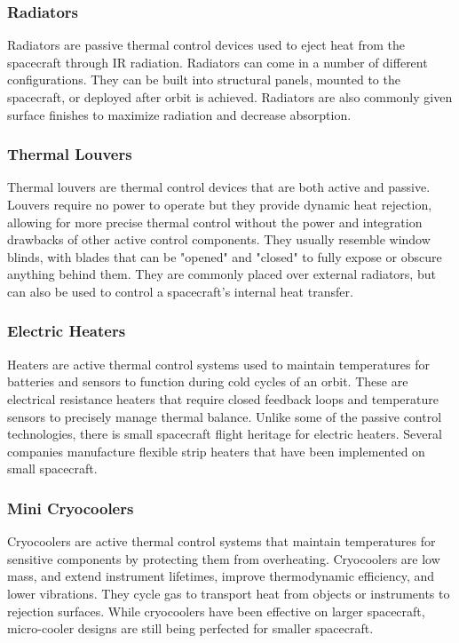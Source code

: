 \documentclass{ece}
\begin{document}
\subsubsection{Radiators}
Radiators are passive thermal control devices used to eject heat from the spacecraft through IR radiation. Radiators can come in a number of different configurations. They can be built into structural panels, mounted to the spacecraft, or deployed after orbit is achieved. Radiators are also commonly given surface finishes to maximize radiation and decrease absorption. 

\subsubsection{Thermal Louvers}
Thermal louvers are thermal control devices that are both active and passive. Louvers require no power to operate but they provide dynamic heat rejection, allowing for more precise thermal control without the power and integration drawbacks of other active control components. They usually resemble window blinds, with blades that can be "opened" and "closed" to fully expose or obscure anything behind them. They are commonly placed over external radiators, but can also be used to control a spacecraft's internal heat transfer.

\subsubsection{Electric Heaters}
Heaters are active thermal control systems used to maintain temperatures for batteries and sensors to function during cold cycles of an orbit. These are electrical resistance heaters that require closed feedback loops and temperature sensors to precisely manage thermal balance. Unlike some of the passive control technologies, there is small spacecraft flight heritage for electric heaters. Several companies manufacture flexible strip heaters that have been implemented on small spacecraft. 

\subsubsection{Mini Cryocoolers}
Cryocoolers are active thermal control systems that maintain temperatures for sensitive components by protecting them from overheating. Cryocoolers are low mass, and extend instrument lifetimes, improve thermodynamic efficiency, and lower vibrations. They cycle gas to transport heat from objects or instruments to rejection surfaces. While cryocoolers have been effective on larger spacecraft, micro-cooler designs are still being perfected for smaller spacecraft.
\end{document}
